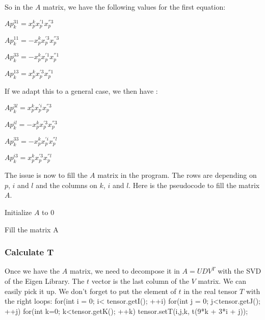 \documentclass{report}
\begin{document}
So in the $A$ matrix, we have the following values for the first equation: 
\begin{center}
$Ap_{k}^{31} = x_{p}^{k}x_{p}^{'1}x_{p}^{''3}$
\end{center}
\begin{center}
$Ap_{k}^{11} = - x_{p}^{k}x_{p}^{'3}x_{p}^{''3}$
\end{center}
\begin{center}
$Ap_{k}^{33} = -x_{p}^{k} x_{p}^{'1}x_{p}^{''1}$
\end{center}
\begin{center}
$Ap_{k}^{13} = x_{p}^{k}x_{p}^{'3}x_{p}^{''1}$
\end{center}

If we adapt this to a general case, we then have  : 
\begin{center}
$Ap_{k}^{3l} = x_{p}^{k}x_{p}^{'i}x_{p}^{''3}$
\end{center}
\begin{center}
$Ap_{k}^{il} = - x_{p}^{k}x_{p}^{'3}x_{p}^{''3}$
\end{center}
\begin{center}
$Ap_{k}^{33} = -x_{p}^{k} x_{p}^{'i}x_{p}^{''l}$
\end{center}
\begin{center}
$Ap_{k}^{i3} = x_{p}^{k}x_{p}^{'3}x_{p}^{''l}$
\end{center}


The issue is now to fill the $A$ matrix in the program. The rows are depending on $p$, $i$ and $l$ and the columns on $k$, $i$ and $l$. Here is the pseudocode to fill the matrix $A$. 

Initialize $A$ to 0
\begin{algorithm}
\SetLine
\caption{Fill the matrix A}
\SetLine
{}
\end{algorithm}
\subsubsection{Calculate T}
Once we have the $A$ matrix, we need to decompose it in $A=UDV^{T}$ with the SVD of the Eigen Library. The $t$ vector is the last column of the $V$ matrix. We can easily pick it up. 
We don't forget to put the element of $t$ in the real tensor $T$ with the right loops: 
for(int i = 0; i< tensor.getI(); ++i) {
      for(int j = 0; j<tensor.getJ(); ++j) {
        for(int k=0; k<tensor.getK(); ++k) {
          tensor.setT(i,j,k, t(9*k + 3*i + j));
        }
      }
    }
\end{document}
